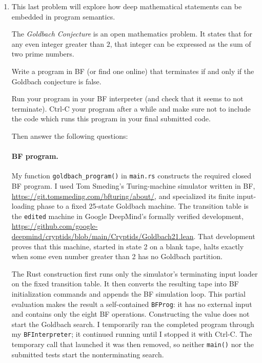 \documentclass{article}
\begin{document}
\begin{enumerate}

\item
This last problem will explore how deep mathematical statements can be embedded in program semantics.

The \emph{Goldbach Conjecture} is an open mathematics problem.
It states that for any even integer greater than $2$, that integer can be expressed
as the sum of two prime numbers.

Write a program in BF (or find one online) that terminates if and only if the Goldbach conjecture is false.

Run your program in your BF interpreter (and check that it seems to not terminate).
Ctrl-C your program after a while and make sure not to include the code which runs this program
in your final submitted code.

Then answer the following questions:

\paragraph{BF program.}
My function \texttt{goldbach\_program()} in \texttt{main.rs} constructs the
required closed BF program.  I used Tom Smeding's Turing-machine simulator
written in BF,
\url{https://git.tomsmeding.com/bfturing/about/}, and specialized its finite
input-loading phase to a fixed 25-state Goldbach machine.  The transition
table is the \texttt{edited} machine in Google DeepMind's formally verified
development,
\url{https://github.com/google-deepmind/cryptids/blob/main/Cryptids/Goldbach21.lean}.
That development proves that this machine, started in state 2 on a blank tape,
halts exactly when some even number greater than 2 has no Goldbach partition.

The Rust construction first runs only the simulator's terminating input loader
on the fixed transition table.  It then converts the resulting tape into BF
initialization commands and appends the BF simulation loop.  This partial
evaluation makes the result a self-contained \texttt{BFProg}: it has no
external input and contains only the eight BF operations.  Constructing the
value does not start the Goldbach search.  I temporarily ran the completed
program through my \texttt{BFInterpreter}; it continued running until I
stopped it with Ctrl-C.  The temporary call that launched it was then removed,
so neither \texttt{main()} nor the submitted tests start the nonterminating
search.


\end{enumerate}
\end{document}
